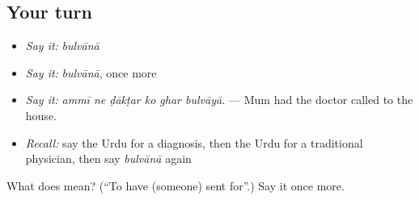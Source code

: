 \subsection*{Your turn}
\begin{itemize}
\raggedright
  \item \emph{Say it:} \emph{bulvānā}
  \item \emph{Say it:} \emph{bulvānā}, once more
  \item \emph{Say it:} \emph{ammī ne ḍākṭar ko ghar bulvāyā.} — Mum had the doctor called to the house.
  \item \emph{Recall:} say the Urdu for a diagnosis, then the Urdu for a traditional physician, then say \emph{bulvānā} again
\end{itemize}

\begin{tcolorbox}[breakable,colback=teal!4,colframe=teal!35!black,title={Before you move on}]
What does  mean? (\textquotedblleft{}To have (someone) sent for\textquotedblright{}.) Say it once more.
\end{tcolorbox}
